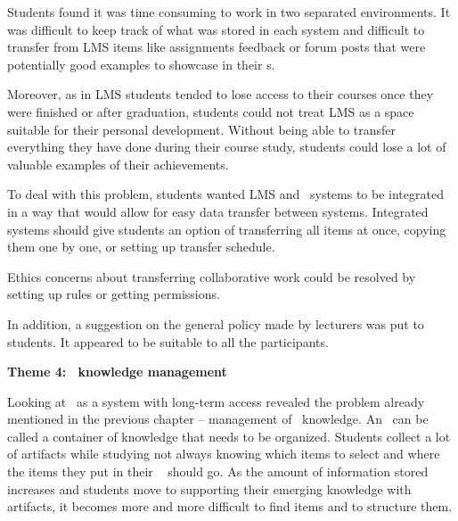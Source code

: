 Students found it was time consuming to work in two separated environments. It
was difficult to keep track of what was stored in each system and difficult to
transfer from LMS items like assignments feedback or forum posts that were
potentially good examples to showcase in their \ep s.


Moreover, as in LMS students tended to lose access to their courses once they
were finished or after graduation, students could not treat LMS as a space
suitable for their personal development. Without being able to transfer
everything they have done during their course study, students could lose a lot
of valuable examples of their achievements.


To deal with this problem, students wanted LMS and \ep~systems to be integrated
in a way that would allow for easy data transfer between systems. Integrated
systems should give students an option of transferring all items at once,
copying them one by one, or setting up transfer schedule.

Ethics concerns about transferring collaborative work could be resolved by
setting up rules or getting permissions.


In addition, a suggestion on the general policy made by lecturers was put to
students. It appeared to be suitable to all the participants. 

\textbf{Theme 4: \ep~knowledge management}

Looking at \ep~as a system with long-term access revealed the problem already
mentioned in the previous chapter -- management of \ep~knowledge. An \ep~can be
called a container of knowledge that needs to be organized. Students collect a
lot of artifacts while studying not always knowing which items to select and
where the items they put in their \ep~ should go. As the amount of information
stored increases and students move to supporting their emerging knowledge with
artifacts, it becomes more and more difficult to find items and to structure
them.

